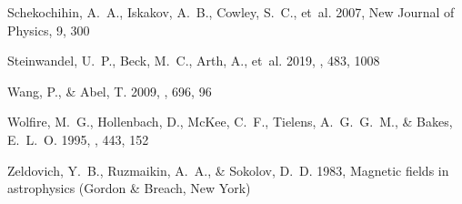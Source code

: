 \documentclass[preprint2]{aastex63}
\begin{document}
\begin{thebibliography}{}
{Schekochihin}, A.~A., {Iskakov}, A.~B., {Cowley}, S.~C., {et~al.} 2007, New
 Journal of Physics, 9, 300

{Steinwandel}, U.~P., {Beck}, M.~C., {Arth}, A., {et~al.} 2019, \mnras, 483,
 1008

{Wang}, P., \& {Abel}, T. 2009, \apj, 696, 96

{Wolfire}, M.~G., {Hollenbach}, D., {McKee}, C.~F., {Tielens}, A.~G.~G.~M., \&
 {Bakes}, E.~L.~O. 1995, \apj, 443, 152

{Zeldovich}, Y.~B., {Ruzmaikin}, A.~A., \& {Sokolov}, D.~D. 1983, {Magnetic
 fields in astrophysics} (Gordon \& Breach, New York)

\end{thebibliography}
\end{document}
